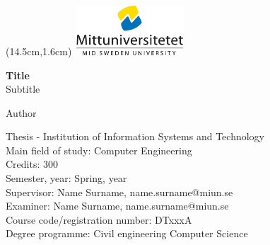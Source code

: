 \documentclass[12pt,a4paper]{report}
\begin{document}

{\sffamily
{}
\begin{titlepage}
{
\begin{textblock*}{13cm}(14.5cm,1.6cm) %
\includegraphics[width=4.1cm,height=1.85cm]{Illustrations/miun-mini-logo.png}
\end{textblock*}
}
\vspace*{9ex}
\noindent\Large{\textbf{Title}}\\

\vspace*{-1ex}
\hspace{-2ex}\normalsize{Subtitle}\\
\vspace{3.5ex}

\hspace{-2.7ex}\normalsize{Author}\\
\vspace{56ex}

\scriptsize{
\noindent\vspace*{1ex}
Thesis - Institution of Information Systems and Technology\\\vspace*{0.6ex}
Main field of study: Computer Engineering\\\vspace*{0.6ex}
Credits: 300\\\vspace*{0.6ex}
Semester, year: Spring, year  \\\vspace*{0.6ex}
Supervisor: Name Surname, name.surname@miun.se\\\vspace*{0.6ex}
Examiner: Name Surname, name.surname@miun.se\\\vspace*{0.6ex}
Course code/registration number: DTxxxA\\\vspace*{0.6ex}
Degree programme: Civil engineering Computer Science\\
}
\end{titlepage}
\setcounter{page}{2}
\restoregeometry
{}
\newpage

}
\pagestyle{fancy}
\fancyhead{}
\fancyhead[R]{\today}
\fancyfoot[C]{\vspace*{-1.6\baselineskip}\thepage}
\end{document}
